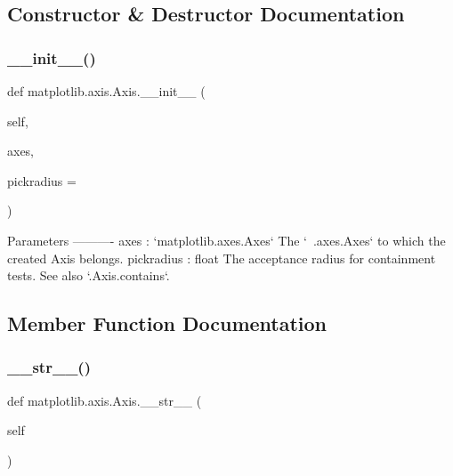 \subsection{Constructor \& Destructor Documentation}
\mbox{\label{classmatplotlib_1_1axis_1_1Axis_add4ea36bf68203607e2e81f3653b0cc9}} 
\subsubsection{\texorpdfstring{\+\_\+\+\_\+init\+\_\+\+\_\+()}{\_\_init\_\_()}}
{\footnotesize\ttfamily def matplotlib.\+axis.\+Axis.\+\_\+\+\_\+init\+\_\+\+\_\+ (\begin{DoxyParamCaption}\item[{}]{self,  }\item[{}]{axes,  }\item[{}]{pickradius = {} }\end{DoxyParamCaption})}

\begin{DoxyVerb}Parameters
----------
axes : `matplotlib.axes.Axes`
    The `~.axes.Axes` to which the created Axis belongs.
pickradius : float
    The acceptance radius for containment tests. See also
    `.Axis.contains`.
\end{DoxyVerb}
 

\subsection{Member Function Documentation}
\mbox{\label{classmatplotlib_1_1axis_1_1Axis_a90232298e55ba6f846258a8d26fc3a6c}} 
\subsubsection{\texorpdfstring{\+\_\+\+\_\+str\+\_\+\+\_\+()}{\_\_str\_\_()}}
{\footnotesize\ttfamily def matplotlib.\+axis.\+Axis.\+\_\+\+\_\+str\+\_\+\+\_\+ (\begin{DoxyParamCaption}\item[{}]{self }\end{DoxyParamCaption})}

